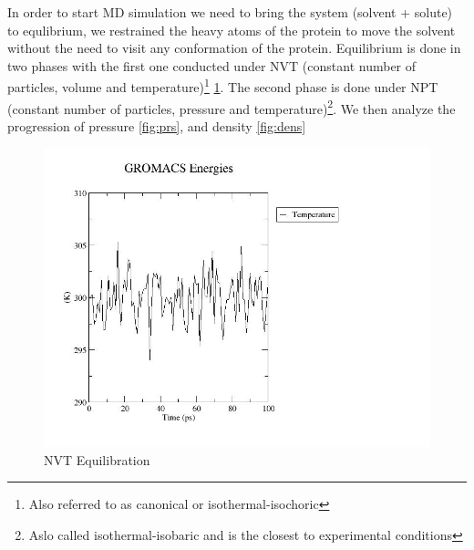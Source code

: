 \documentclass{article}
\begin{document}
 In order to start MD simulation we need to bring the system (solvent + solute) to equlibrium, we restrained the heavy atoms of the protein to move the solvent without the need to visit any conformation of the protein. Equilibrium is done in two phases with the first one conducted under NVT (constant number of particles, volume and temperature)\footnote{Also referred to as canonical or isothermal-isochoric} \cref{fig:temp}. The second phase is done under NPT (constant number of particles, pressure and temperature)\footnote{Aslo called isothermal-isobaric and is the closest to experimental conditions}. We then analyze the progression of pressure \cref{fig:prs}, and density \cref{fig:dens}
 
  \begin{figure}[H]
     \centering
     \includegraphics[width= \linewidth]{temperature.jpg}
     \caption{NVT Equilibration}
     \label{fig:temp}
 \end{figure}
\end{document}
